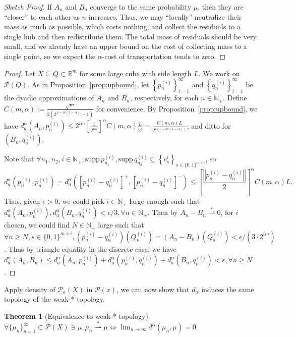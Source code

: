 \documentclass[fleqn]{article}
\newtheorem{thm}{Theorem}[section]
\theoremstyle{definition}
\theoremstyle{remark}
\renewcommand{\l}[1][n]{\lim_{#1\rightarrow\infty}} %
\renewcommand{\P}{\mathcal{P}} %
\newcommand{\wstar}{\stackrel{*}{\rightharpoonup}} %
\newcommand{\supp}{\mathrm{supp}\,} %
\begin{document}
\begin{proof}[Sketch Proof]
If $A_n$ and $B_n$ converge to the same probability $\mu$, then they are ``closer'' to each other as $n$ increases. Thus, we may ``locally'' neutralize their mass as much as possible, which costs nothing, and collect the residuals to a single hub and then redistribute them. The total mass of residuals should be very small, and we already have an upper bound on the cost of collecting mass to a single point, so we expect the $\alpha$-cost of transportation tends to zero.
\end{proof}

\begin{proof}
Let $X\subseteq Q\subset \mathbb{R}^m$ for some large cube with side length $L$. We work on $\P(Q)$. As in Proposition~\ref{prop:upbound}, let $\left\{p^{(i)}_n\right\}_{i=1}^\infty$ and $\left\{q^{(i)}_n\right\}_{i=1}^\infty$ be the dyadic approximations of $A_n$ and $B_n$, respectively, for each $n\in\mathbb{N}_+$. Define $C(m,\alpha):=\frac{\sqrt{m}}{2\left(2^{1-m(1-\alpha)}-1\right)}$ for convenience. By Proposition~\ref{prop:upbound}, we have $d_a^\alpha \left(A_n,p^{(i)}_n \right) \le 2^{im} \left[\frac{1}{2^{im}}\right]^\alpha C(m,\alpha) \frac{L}{2^i} = \frac{C(m,\alpha) L}{2^{i(1-m(1-\alpha))}}$, and ditto for $(B_n,q^{(i)}_n)$.
\par
Note that $\forall n_1,n_2, i\in\mathbb{N}_+, \supp p^{(i)}_{n_1}, \supp q^{(i)}_{n_2} \subseteq \left\{c^{i}_s\right\}_{s\in\{0,1\}^{m\times i}}$, so
$$d_a^\alpha\left(p^{(i)}_n,p^{(i)}_n\right) = d_a^\alpha\left(\left[p^{(i)}_n-q^{(i)}_n\right]^+, \left[p^{(i)}_n-q^{(i)}_n\right]^-\right) \le \left[\frac{\left\Vert p^{(i)}_n-q^{(i)}_n\right\Vert}{2}\right]^\alpha C(m,\alpha) L.$$
Thus, given $\epsilon >0$, we could pick $i\in\mathbb{N}_+$ large enough such that $d_a^\alpha\left(A_n,p^{(i)}_n\right),d_a^\alpha\left(B_n,q^{(i)}_n\right) < \epsilon/3, \forall n\in\mathbb{N}_+$. Then by $A_n-B_n \wstar 0$, for $i$ chosen, we could find $N\in\mathbb{N}_+$ large such that $\forall n\ge N, s\in\{0,1\}^{m\times i}, \left(p^{(i)}_n -q^{(i)}_n\right)(Q^{(i)}_s)=(A_n-B_n)(Q^{(i)}_s) <\epsilon/(3\cdot 2^{im})$. Thus by triangle equality in the discrete case, we have $d_a^\alpha\left(A_n,B_n\right) \le d_a^\alpha\left(A_n,p^{(i)}_n\right) + d_a^\alpha\left(p^{(i)}_n, q^{(i)}_n\right) + d_a^\alpha\left(B_n,q^{(i)}_n\right) < \epsilon, \forall n\ge N$.
\end{proof}

\par
Apply density of $\P_a(X)$ in $\P(x)$, we can now show that $d_\alpha$ induces the same topology of the weak-* topology.
\begin{thm}[Equivalence to weak-* topology]
$\forall \{\mu_n\}_{n=1}^\infty \subset \P(X) \ni\mu, \mu_n \wstar \mu \iff \l d^\alpha(\mu_n,\mu)=0.$
\end{thm}
\end{document}
